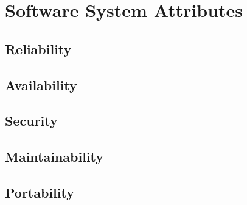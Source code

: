 \section{Software System Attributes}

\subsection{Reliability}
\subsection{Availability}
\subsection{Security}
\subsection{Maintainability}
\subsection{Portability}
